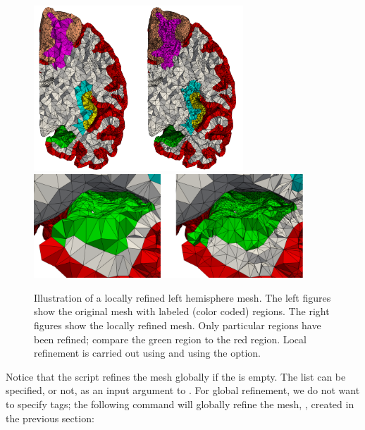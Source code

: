 \begin{figure}[t]	
  \begin{center}
    \includegraphics[width=0.7\textwidth]{./graphics/chp4/fenics-parcellation-crinkle.png} \\
    \includegraphics[width=0.9\textwidth]{./graphics/chp4/parcellations_refine_zoom.png}
  \end{center}
  \caption{Illustration of a locally refined left hemisphere mesh. The left 
  figures show the original mesh with labeled (color coded) regions. The 
  right figures show the locally refined mesh. Only particular 
  regions have been refined; compare the green region to the red region. Local 
  refinement is carried out using  and 
  using the  option.}
  \label{fig:chp4:fenics-parc}
\end{figure}
Notice that the script  refines the mesh 
globally if the  is empty. The  list 
can be specified, or not, as an input argument to 
. For global refinement, we do not want 
to specify tags; the following command will globally refine the mesh, 
, created in the previous section:


